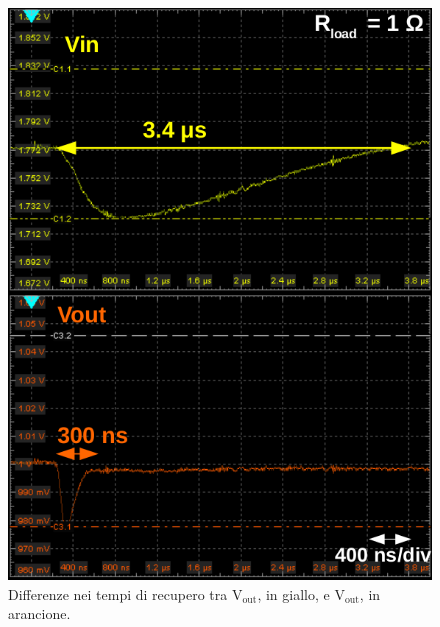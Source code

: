 \newpage
\begin{figure}
\centering
\includegraphics[scale=.35]{Immagini/DipendenzaVoutdaVin}
\caption{Differenze nei tempi di recupero tra $\mathrm{V_{out}}$, in giallo, e $\mathrm{V_{out}}$, in arancione.}
\label{DipVoutVin}
\end{figure}

